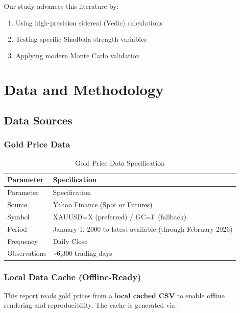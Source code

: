 \documentclass[
  11pt,
  a4paper,
  oneside,
  openany]{article}
\providecommand{\tightlist}{%
  \setlength{\itemsep}{0pt}\setlength{\parskip}{0pt}}\usepackage{longtable,booktabs,array}
\begin{document}
Our study advances this literature by:

\begin{enumerate}
\def\labelenumi{\arabic{enumi}.}
\tightlist
\item
  Using high-precision sidereal (Vedic) calculations
\item
  Testing specific Shadbala strength variables
\item
  Applying modern Monte Carlo validation
\end{enumerate}

\section{Data and Methodology}\label{data-and-methodology}

\subsection{Data Sources}\label{data-sources}

\subsubsection{Gold Price Data}\label{gold-price-data}

\begin{longtable}[]{@{}ll@{}}
\caption{Gold Price Data Specification}\label{tbl-gold}\tabularnewline
\toprule\noalign{}
Parameter & Specification \\
\midrule\noalign{}
\endfirsthead
\toprule\noalign{}
Parameter & Specification \\
\midrule\noalign{}
\endhead
\bottomrule\noalign{}
\endlastfoot
Source & Yahoo Finance (Spot or Futures) \\
Symbol & XAUUSD=X (preferred) / GC=F (fallback) \\
Period & January 1, 2000 to latest available (through February 2026) \\
Frequency & Daily Close \\
Observations & \textasciitilde6,300 trading days \\
\end{longtable}

\subsubsection{Local Data Cache
(Offline-Ready)}\label{local-data-cache-offline-ready}

This report reads gold prices from a \textbf{local cached CSV} to enable
offline rendering and reproducibility. The cache is generated via:
\end{document}
